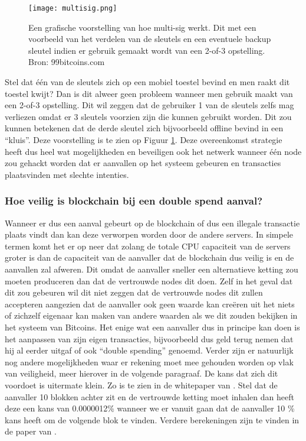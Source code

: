 \begin{figure}
	\texttt{[image: multisig.png]}
	\caption{Een grafische voorstelling van hoe multi-sig werkt. Dit met een voorbeeld van het verdelen van de sleutels en een eventuele backup sleutel indien er gebruik gemaakt wordt van een 2-of-3 opstelling. Bron: 99bitcoins.com}
	\label{fig:multisig}
\end{figure}

Stel dat één van de sleutels zich op een mobiel toestel bevind en men raakt dit toestel kwijt? 
Dan is dit alweer geen probleem wanneer men gebruik maakt van een 2-of-3 opstelling. Dit wil zeggen dat de gebruiker 1 van de sleutels zelfs mag verliezen omdat er 3 sleutels voorzien zijn die kunnen gebruikt worden. Dit zou kunnen betekenen dat de derde sleutel zich bijvoorbeeld offline bevind in een ``kluis''. Deze voorstelling is te zien op Figuur \ref{fig:multisig}. Deze overeenkomst strategie heeft dus heel wat mogelijkheden en beveiligen ook het netwerk wanneer één node zou gehackt worden dat er aanvallen op het systeem gebeuren en transacties plaatsvinden met slechte intenties. 

\subsubsection{Hoe veilig is blockchain bij een double spend aanval?}
\label{sec:hoeveiligisblockchain}
Wanneer er dus een aanval gebeurt op de blockchain of dus een illegale transactie plaats vindt dan kan deze verworpen worden door de andere servers. In simpele termen komt het er op neer dat zolang de totale CPU capaciteit van de servers groter is dan de capaciteit van de aanvaller dat de blockchain dus veilig is en de aanvallen zal afweren. Dit omdat de aanvaller sneller een alternatieve ketting zou moeten produceren  dan dat de vertrouwde nodes dit doen. Zelf in het geval dat dit zou gebeuren wil dit niet zeggen dat de vertrouwde nodes dit zullen accepteren aangezien dat de aanvaller ook geen waarde kan creëren uit het niets of zichzelf eigenaar kan maken van andere waarden als we dit zouden bekijken in het systeem van Bitcoins. Het enige wat een aanvaller dus in principe kan doen is het aanpassen van zijn eigen transacties, bijvoorbeeld dus geld terug nemen dat hij al eerder uitgaf of ook ``double spending'' genoemd. Verder zijn er natuurlijk nog andere mogelijkheden waar er rekening moet mee gehouden worden op vlak van veiligheid, meer hierover in de volgende paragraaf. De kans dat zich dit voordoet is uitermate klein. Zo is te zien in de whitepaper van \textcite{Nakamoto2008}. Stel dat de aanvaller 10 blokken achter zit en de vertrouwde ketting moet inhalen dan heeft deze een kans van 0.0000012\% wanneer we er vanuit gaan dat de aanvaller 10 \% kans heeft om de volgende blok te vinden. Verdere berekeningen zijn te vinden in de paper van \autocite{Nakamoto2008}.

